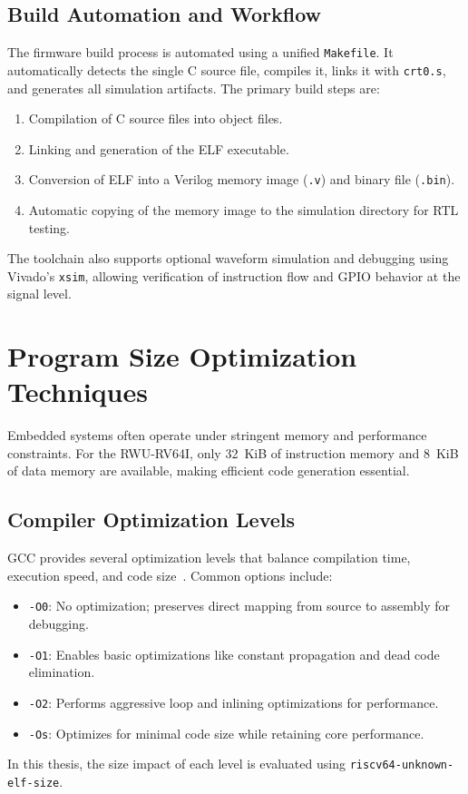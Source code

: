 \subsection{Build Automation and Workflow}
The firmware build process is automated using a unified \texttt{Makefile}.  
It automatically detects the single C source file, compiles it, links it with \texttt{crt0.s}, and generates all simulation artifacts.  
The primary build steps are:
\begin{enumerate}
  \item Compilation of C source files into object files.
  \item Linking and generation of the ELF executable.
  \item Conversion of ELF into a Verilog memory image (\texttt{.v}) and binary file (\texttt{.bin}).
  \item Automatic copying of the memory image to the simulation directory for RTL testing.
\end{enumerate}
The toolchain also supports optional waveform simulation and debugging using Vivado’s \texttt{xsim}, allowing verification of instruction flow and GPIO behavior at the signal level.

\section{Program Size Optimization Techniques}
Embedded systems often operate under stringent memory and performance constraints.  
For the RWU-RV64I, only 32~KiB of instruction memory and 8~KiB of data memory are available, making efficient code generation essential.

\subsection{Compiler Optimization Levels}
GCC provides several optimization levels that balance compilation time, execution speed, and code size~\cite{gcc}.  
Common options include:
\begin{itemize}
  \item \texttt{-O0}: No optimization; preserves direct mapping from source to assembly for debugging.
  \item \texttt{-O1}: Enables basic optimizations like constant propagation and dead code elimination.
  \item \texttt{-O2}: Performs aggressive loop and inlining optimizations for performance.
  \item \texttt{-Os}: Optimizes for minimal code size while retaining core performance.
\end{itemize}
In this thesis, the size impact of each level is evaluated using \texttt{riscv64-unknown-elf-size}.

